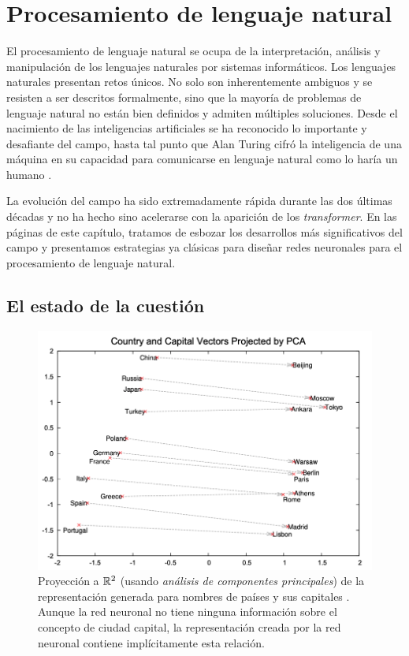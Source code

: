 \chapter{Procesamiento de lenguaje natural}
El procesamiento de lenguaje natural se ocupa de la interpretación, análisis y manipulación de los lenguajes naturales por sistemas informáticos. Los lenguajes naturales presentan retos únicos. No solo son inherentemente ambiguos y se resisten a ser descritos formalmente, sino que la mayoría de problemas de lenguaje natural no están bien definidos y admiten múltiples soluciones. Desde el nacimiento de las inteligencias artificiales se ha reconocido lo importante y desafiante del campo, hasta tal punto que Alan Turing cifró la inteligencia de una máquina en su capacidad para comunicarse en lenguaje natural como lo haría un humano \cite{turing2009computing}.

La evolución del campo ha sido extremadamente rápida durante las dos últimas décadas y no ha hecho sino acelerarse con la aparición de los \textit{transformer}. En las páginas de este capítulo, tratamos de esbozar los desarrollos más significativos del campo y presentamos estrategias ya clásicas para diseñar redes neuronales para el procesamiento de lenguaje natural. 

\section{El estado de la cuestión}
\begin{figure}[tb]
    \centering
    \includegraphics[width=.6\textwidth]{figures/chapter3/embeddings.png}
    \caption{Proyección a \( \mathbb{R}^{2} \) (usando \textit{análisis de componentes principales}) de la representación generada para nombres de países y sus capitales \cite{mikolov2013distributed}. Aunque la red neuronal no tiene ninguna información sobre el concepto de ciudad capital, la representación creada por la red neuronal contiene implícitamente esta relación.}
    \label{fig:embeddings}
\end{figure}

